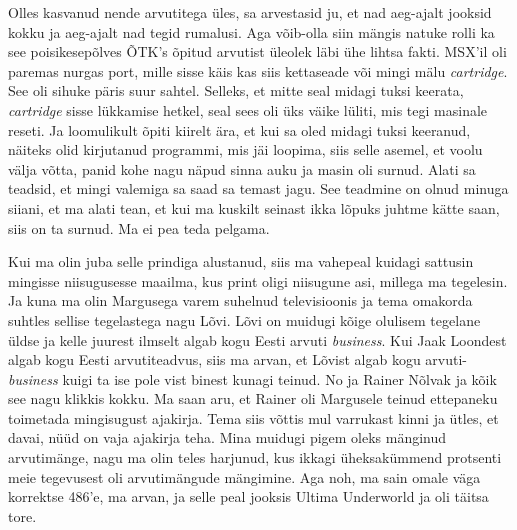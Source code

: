 
Olles kasvanud nende arvutitega üles, sa arvestasid ju, et nad aeg-ajalt jooksid kokku ja aeg-ajalt nad tegid rumalusi. Aga võib-olla siin mängis natuke rolli ka see  poisikesepõlves ÕTK's õpitud arvutist üleolek läbi ühe lihtsa fakti. MSX'il oli paremas nurgas port, mille sisse käis kas siis kettaseade või mingi mälu \emph{cartridge}. See oli sihuke päris suur sahtel. Selleks, et mitte seal midagi tuksi keerata, \emph{cartridge} sisse lükkamise hetkel, seal sees oli üks väike lüliti, mis tegi masinale reseti. Ja loomulikult õpiti kiirelt ära, et kui sa oled midagi tuksi keeranud, näiteks olid kirjutanud programmi, mis jäi loopima, siis selle asemel, et voolu välja võtta, panid kohe nagu näpud sinna auku ja masin oli surnud. Alati sa teadsid, et mingi valemiga sa saad sa temast jagu. See teadmine on olnud minuga siiani, et ma alati tean, et kui ma kuskilt seinast ikka lõpuks juhtme kätte saan, siis on ta surnud. Ma ei pea teda pelgama.


Kui ma olin juba selle prindiga alustanud, siis ma vahepeal kuidagi sattusin mingisse niisugusesse maailma, kus print oligi niisugune asi, millega ma tegelesin. Ja kuna ma olin Margusega varem suhelnud  televisioonis ja tema omakorda suhtles sellise tegelastega nagu Lõvi. Lõvi on muidugi kõige olulisem tegelane üldse ja kelle juurest ilmselt algab kogu Eesti arvuti \emph{business}. Kui Jaak Loondest algab kogu Eesti arvutiteadvus, siis ma arvan, et Lõvist algab kogu arvuti-\emph{business} kuigi ta ise pole vist binest kunagi teinud. No ja Rainer Nõlvak ja kõik see nagu klikkis kokku. Ma saan aru, et Rainer oli Margusele teinud ettepaneku toimetada mingisugust ajakirja. Tema siis võttis mul varrukast kinni ja ütles, et davai, nüüd on vaja ajakirja teha. Mina muidugi pigem oleks mänginud arvutimänge, nagu ma olin teles harjunud, kus ikkagi üheksakümmend protsenti meie tegevusest oli arvutimängude mängimine. Aga noh, ma sain omale väga korrektse 486'e, ma arvan, ja selle peal jooksis Ultima Underworld ja oli täitsa tore. 

